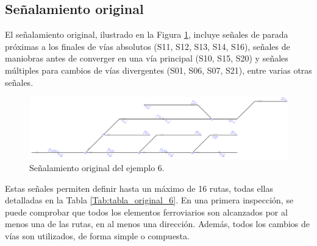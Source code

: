 \subsection{Señalamiento original}

    El señalamiento original, ilustrado en la Figura \ref{fig:EJ6_2}, incluye señales de parada próximas a los finales de vías absolutos (S11, S12, S13, S14, S16), señales de maniobras antes de converger en una vía principal (S10, S15, S20) y señales múltiples para cambios de vías divergentes (S01, S06, S07, S21), entre varias otras señales.
    
    \begin{figure}[H]
    	\centering
    	\includegraphics[width=1\textwidth]{resultados-obtenidos/ejemplo6/images/6_original.png}
    	\centering\caption{Señalamiento original del ejemplo 6.}
    	\label{fig:EJ6_2}
    \end{figure}
    
    Estas señales permiten definir hasta un máximo de 16 rutas, todas ellas detalladas en la Tabla \ref{Tab:tabla_original_6}. En una primera inspección, se puede comprobar que todos los elementos ferroviarios son alcanzados por al menos una de las rutas, en al menos una dirección. Además, todos los cambios de vías son utilizados, de forma simple o compuesta. 
    
